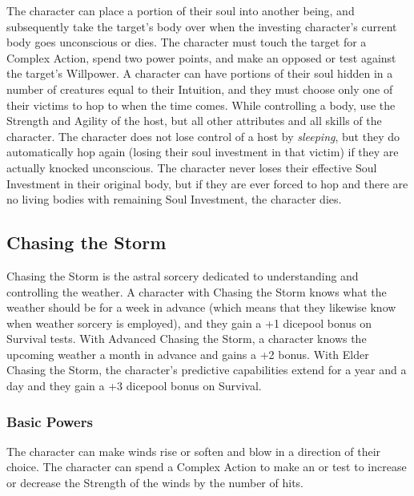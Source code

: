  The character can place a portion of their soul into another being, and subsequently take the target's body over when the investing character's current body goes unconscious or dies. The character must touch the target for a Complex Action, spend two power points, and make an opposed  or  test against the target's Willpower. A character can have portions of their soul hidden in a number of creatures equal to their Intuition, and they must choose only one of their victims to hop to when the time comes. While controlling a body, use the Strength and Agility of the host, but all other attributes and all skills of the character. The character does not lose control of a host by \textit{sleeping}, but they do automatically hop again (losing their soul investment in that victim) if they are actually knocked unconscious. The character never loses their effective Soul Investment in their original body, but if they are ever forced to hop and there are no living bodies with remaining Soul Investment, the character dies.


\subsection{Chasing the Storm}

Chasing the Storm is the astral sorcery dedicated to understanding and controlling the weather. A character with Chasing the Storm knows what the weather should be for a week in advance (which means that they likewise know when weather sorcery is employed), and they gain a +1 dicepool bonus on Survival tests. With Advanced Chasing the Storm, a character knows the upcoming weather a month in advance and gains a +2 bonus. With Elder Chasing the Storm, the character's predictive capabilities extend for a year and a day and they gain a +3 dicepool bonus on Survival.

\subsubsection{Basic Powers}

 The character can make winds rise or soften and blow in a direction of their choice. The character can spend a Complex Action to make an  or  test to increase or decrease the Strength of the winds by the number of hits.

